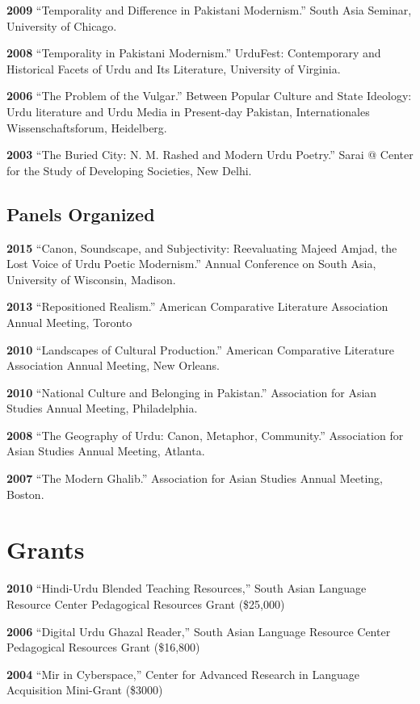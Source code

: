 \documentclass[letterpaper,12pt]{article}
\begin{document}
\textbf{2009}
“Temporality and Difference in Pakistani Modernism.”
South Asia Seminar, University of Chicago.

\textbf{2008}
“Temporality in Pakistani Modernism.”
UrduFest: Contemporary and Historical Facets of Urdu and Its Literature,
University of Virginia.

\textbf{2006}
“The Problem of the Vulgar.”
Between Popular Culture and State Ideology:
Urdu literature and Urdu Media in Present-day Pakistan,
Internationales Wissenschaftsforum, Heidelberg.

\textbf{2003}
“The Buried City: N. M. Rashed and Modern Urdu Poetry.”
Sarai @ Center for the Study of Developing Societies, New Delhi.


\subsection{Panels Organized%
  \label{panels-organized}%
}

\textbf{2015}
“Canon, Soundscape, and Subjectivity: Reevaluating Majeed Amjad, the Lost Voice of Urdu Poetic Modernism.”
Annual Conference on South Asia, University of Wisconsin, Madison.

\textbf{2013}
“Repositioned Realism.”
American Comparative Literature Association Annual Meeting, Toronto

\textbf{2010}
“Landscapes of Cultural Production.”
American Comparative Literature Association Annual Meeting, New Orleans.

\textbf{2010}
“National Culture and Belonging in Pakistan.”
Association for Asian Studies Annual Meeting, Philadelphia.

\textbf{2008}
“The Geography of Urdu: Canon, Metaphor, Community.”
Association for Asian Studies Annual Meeting, Atlanta.

\textbf{2007}
“The Modern Ghalib.”
Association for Asian Studies Annual Meeting, Boston.


\section{Grants%
  \label{grants}%
}

\textbf{2010}
“Hindi-Urdu Blended Teaching Resources,”
South Asian Language Resource Center Pedagogical Resources Grant (\$25,000)

\textbf{2006}
“Digital Urdu Ghazal Reader,”
South Asian Language Resource Center Pedagogical Resources Grant (\$16,800)

\textbf{2004}
“Mir in Cyberspace,”
Center for Advanced Research in Language Acquisition Mini-Grant (\$3000)
\end{document}
